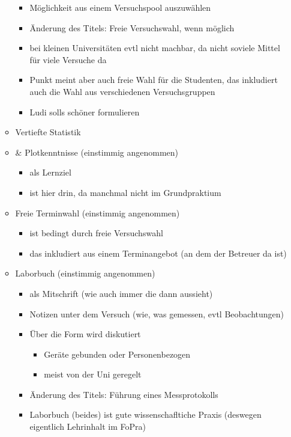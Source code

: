 \begin{itemize}
\begin{itemize}
\begin{itemize}
          \item Möglichkeit aus einem Versuchspool auszuwählen
          \item Änderung des Titels: Freie Versuchswahl, wenn möglich
          \item bei kleinen Universitäten evtl nicht machbar, da nicht soviele Mittel für viele Versuche da
          \item Punkt meint aber auch freie Wahl für die Studenten, das inkludiert auch die Wahl aus verschiedenen Versuchsgruppen
          \item Ludi solls schöner formulieren
        \end{itemize}
      \item Vertiefte Statistik\item& Plotkenntnisse (einstimmig angenommen)
        \begin{itemize}
          \item als Lernziel
          \item ist hier drin, da manchmal nicht im Grundpraktium
        \end{itemize}
      \item Freie Terminwahl (einstimmig angenommen)
        \begin{itemize}
          \item ist bedingt durch freie Versuchswahl
          \item das inkludiert aus einem Terminangebot (an dem der Betreuer da ist)
        \end{itemize}
      \item Laborbuch (einstimmig angenommen)
        \begin{itemize}
          \item als Mitschrift (wie auch immer die dann aussieht)
          \item Notizen unter dem Versuch (wie, was gemessen, evtl Beobachtungen)
          \item Über die Form wird diskutiert
            \begin{itemize}
              \item Geräte gebunden oder Personenbezogen
              \item meist von der Uni geregelt
            \end{itemize}
          \item Änderung des Titels: Führung eines Messprotokolls
          \item Laborbuch (beides) ist gute wissenschafltiche Praxis (deswegen eigentlich Lehrinhalt im FoPra)

\end{itemize}
\end{itemize}
\end{itemize}
